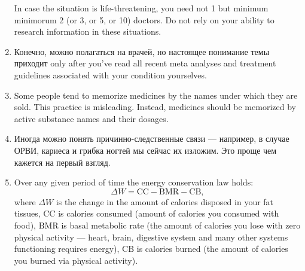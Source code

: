 \documentclass[11pt]{article}
\theoremstyle{remark}
\theoremstyle{definition}
\begin{document}
\begin{enumerate}
In case the situation is life-threatening, you need not 1 but minimum minimorum 2 (or 3, or 5, or 10) doctors. Do not rely on your ability to research information in these situations.

\item Конечно, можно полагаться на врачей, но настоящее понимание темы приходит only after you've read all recent meta analyses and treatment guidelines associated with your condition yourselves.


\item Some people tend to memorize medicines by the names under which they are sold. This practice is misleading. Instead, medicines should be memorized by active substance names and their dosages.

\item %






Иногда можно понять причинно-следственные связи --- например, в случае ОРВИ, кариеса и грибка ногтей мы сейчас их изложим. Это проще чем кажется на первый взгляд.



\item Over any given period of time the energy conservation law holds: $$\Delta W = \text{CC} - \text{BMR} - \text{CB},$$ where $\Delta W$ is the change in the amount of calories disposed in your fat tissues, $\text{CC}$ is calories consumed (amount of calories you consumed with food), $\text{BMR}$ is basal metabolic rate (the amount of calories you lose with zero physical activity --- heart, brain, digestive system and many other systems functioning requires energy), $\text{CB}$ is calories burned (the amount of calories you burned via physical activity).


\end{enumerate}
\end{document}
